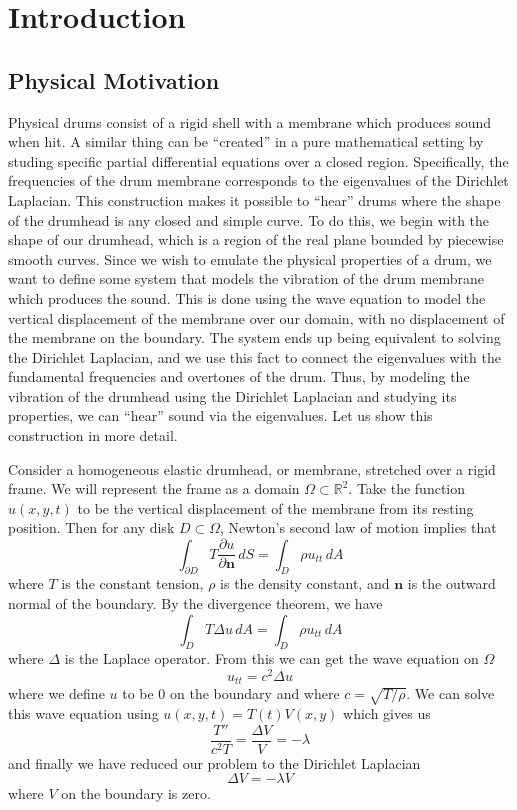 \chapter{Introduction}
\thispagestyle{myheadings}

\section {Physical Motivation}

Physical drums consist of a rigid shell with a membrane which produces sound when hit.
A similar thing can be ``created'' in a pure mathematical setting by studing specific partial differential equations over a closed region.
Specifically, the frequencies of the drum membrane corresponds to the eigenvalues of the Dirichlet Laplacian.
This construction makes it possible to ``hear'' drums where the shape of the drumhead is any closed and simple curve.
To do this, we begin with the shape of our drumhead, which is a region of the real plane bounded by piecewise smooth curves.
Since we wish to emulate the physical properties of a drum, we want to define some system that models the vibration of the drum membrane which produces the sound.
This is done using the wave equation to model the vertical displacement of the membrane over our domain, with no displacement of the membrane on the boundary.
The system ends up being equivalent to solving the Dirichlet Laplacian, and we use this fact to connect the eigenvalues with the fundamental frequencies and overtones of the drum.
Thus, by modeling the vibration of the drumhead using the Dirichlet Laplacian and studying its properties, we can ``hear'' sound via the eigenvalues.
Let us show this construction in more detail.

Consider a homogeneous elastic drumhead, or membrane, stretched over a rigid frame.
We will represent the frame as a domain $\Omega \subset \mathbb{R}^{2}$.
Take the function $u(x,y,t)$ to be the vertical displacement of the membrane from its resting position.
Then for any disk $D \subset \Omega$, Newton's second law of motion implies that
$$ \int_{\partial D} T \frac{\partial u}{\partial \textbf{n}} \, dS = \int_{ D} \rho u_{tt} \, dA $$
where $T$ is the constant tension, $\rho$ is the density constant, and $\textbf{n}$ is the outward normal of the boundary.
By the divergence theorem, we have
$$ \int_{D} T \Delta u \, dA = \int_{D} \rho u_{tt} \, dA $$
where $\Delta$ is the Laplace operator.
From this we can get the wave equation on $\Omega$
$$ u_{tt} = c^{2} \Delta u $$
where we define $u$ to be $0$ on the boundary and where $c = \sqrt{T / \rho}$.
We can solve this wave equation using $u(x,y,t) = T(t)V(x,y)$ which gives us
$$ \frac{T''}{c^{2}T} = \frac{\Delta V}{V} = - \lambda $$
and finally we have reduced our problem to the Dirichlet Laplacian
$$ \Delta V = - \lambda V $$
where $V$ on the boundary is zero.

